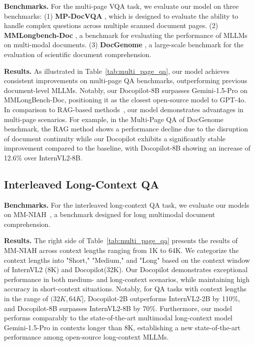 \documentclass[10pt,twocolumn,letterpaper]{article}
\def\modelname{Docopilot\xspace}
\begin{document}
\begin{CJK}{UTF8}{gbsn}
\noindent\textbf{Benchmarks.} For the multi-page VQA task, we evaluate our model on three benchmarks:
(1) \textbf{MP-DocVQA} \cite{tito2023mpdocvqa}, 
which is designed to evaluate the ability to handle complex questions across multiple scanned document pages.
(2) \textbf{MMLongbench-Doc} \cite{ma2024mmlong}, a benchmark for evaluating the performance of MLLMs on multi-modal documents.
(3) \textbf{DocGenome} \cite{xia2024docgenome}, a large-scale benchmark for the evaluation of scientific document comprehension.


\noindent\textbf{Results.}
As illustrated in Table~\ref{tab:multi_page_qa}, our model achieves consistent improvements on multi-page QA benchmarks, outperforming previous document-level MLLMs.
Notably, our \modelname-8B surpasses Gemini-1.5-Pro \cite{reid2024gemini1_5} on MMLongBench-Doc, positioning it as the closest open-source model to GPT-4o. 
In comparison to RAG-based methods~\cite{yu2024visrag, cho2024m3docrag, wang2024mmniah}, our model demonstrates advantages in multi-page scenarios.
For example, in the Multi-Page QA of DocGenome benchmark, the RAG method shows a performance decline due to the disruption of document continuity while our \modelname exhibits a significantly stable improvement compared to the baseline, with \modelname-8B showing an increase of 12.6\% over InternVL2-8B.

\subsection{Interleaved Long-Context QA}

\noindent\textbf{Benchmarks.}
For the interleaved long-context QA task, we evaluate our models on MM-NIAH~\cite{wang2024mmniah}, a benchmark designed for long multimodal document comprehension.

\noindent\textbf{Results.}
The right side of Table~\ref{tab:multi_page_qa} presents the results of MM-NIAH across context lengths ranging from 1K to 64K. We categorize the context lengths into "Short," "Medium," and "Long" based on the context window of InternVL2 (8K) and \modelname (32K). Our \modelname demonstrates exceptional performance in both medium- and long-context scenarios, while maintaining high accuracy in short-context situations. Notably, for QA tasks with context lengths in the range of $(32K, 64K]$, \modelname-2B outperforms InternVL2-2B by 110\%, and \modelname-8B surpasses InternVL2-8B by 70\%. Furthermore, our model performs comparably to the state-of-the-art multimodal long-context model Gemini-1.5-Pro in contexts longer than 8K, establishing a new state-of-the-art performance among open-source long-context MLLMs.


\end{CJK}
\end{document}
